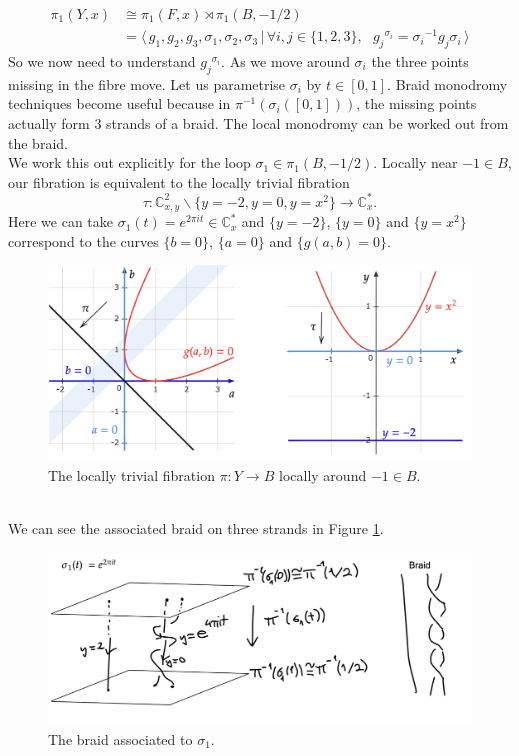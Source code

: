 \documentclass[oneside,reqno]{amsart}
\theoremstyle{definition}
\theoremstyle{definition}
\theoremstyle{definition}
\theoremstyle{definition}
\newcommand{\CC}{\mathbb{C}}
\begin{document}
\begin{align*}
    \pi_1(Y,x) &\cong \pi_1(F,x) \rtimes \pi_1(B,-1/2)  \\
    &=\langle \, g_1,g_2,g_3,\sigma_1,\sigma_2,\sigma_3 \, | \,\forall i,j \in \{1,2,3 \}, \: \: \: {g_j}^{\sigma_i}={\sigma_i}^{-1} g_j \sigma_i \, \rangle
\end{align*}
So we now need to understand ${g_j}^{\sigma_i}$. As we move around $\sigma_i$ the three points missing in the fibre move. Let us parametrise $\sigma_i$ by $t \in [0,1 ]$. Braid monodromy techniques become useful because in $\pi^{-1}(\sigma_i([0,1]))$, the missing points actually form 3 strands of a braid. The local monodromy can be worked out from the braid. \\
\newline
We work this out explicitly for the loop $\sigma_1\in \pi_1(B,-1/2)$. Locally near $-1 \in B$, our fibration is equivalent to the locally trivial fibration 
$$\tau : \CC^2_{x,y}\backslash \{ y=-2, y=0, y=x^2\} \to \CC_x^*.$$
Here we can take $\sigma_1(t) = e^{2\pi it} \in \CC_x^*$ and $\{ y=-2\}$, $\{y=0\}$ and $\{y =x^2\}$ correspond to the curves $\{b=0\}$, $\{a=0\}$ and $\{ g(a,b)=0\}$. 
\begin{figure}[!h]
    \centering
    \includegraphics[width=12cm]{rank2exmp/exmp1tau.png}
    \caption{The locally trivial fibration $\pi: Y \to B$ locally around $-1 \in B$.}
\end{figure}
\\
We can see the associated braid on three strands in Figure \ref{sigma1}.
\begin{figure}[!h]
    \centering
    \includegraphics[width=12cm]{rank2exmp/sigma1.png}
    \caption{The braid associated to $\sigma_1$.}
    \label{sigma1}
\end{figure}
\end{document}
